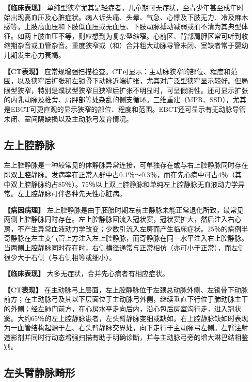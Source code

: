 \textbf{【临床表现】}
单纯型狭窄尤其是轻症者，儿童期可无症状，至青少年甚至成年时始出现高血压及心脏症状。病人诉头痛、头晕、气急、心悸及下肢无力、冷及麻木感等。上肢高血压和下肢低血压或无血压、下肢动脉搏动减弱或扪不清为其典型体征。如两上肢血压不等，则应想到为复杂型缩窄。心前区、背部肩胛区常可听到收缩期杂音或血管杂音。重度狭窄或（和）合并粗大动脉导管未闭、室缺者常于婴幼儿期发生心力衰竭。

\textbf{【CT表现】}
应常规增强扫描检查。CT可显示：主动脉狭窄的部位、程度和范围，以及狭窄后扩张和左锁骨下动脉近端扩张，尤其对广泛型狭窄显示较好。但局限型狭窄，特别是蹼状型狭窄且狭窄后扩张不明显时，可呈假阴性。还可显示扩张的内乳动脉及椎旁、肩胛部等处杂乱的侧支循环。三维重建（MPR、SSD），尤其是EBCT可更直观的显示狭窄的部位、程度和范围。EBCT还可显示有无动脉导管未闭、室间隔缺损以及主动脉弓发育情况。

\subsection{左上腔静脉}

左上腔静脉是一种较常见的体静脉异常连接，可单独存在或与右上腔静脉同时存在即双上腔静脉。发病率在正常人群中占0.1％～0.3％，而在先心病中可占4％（其中双上腔静脉约占85％）。75％以上双上腔静脉和单纯左上腔静脉无血液动力学异常。左上腔静脉可伴各种先天性心脏病。

\textbf{【病因病理】}
左上腔静脉是由于胚胎时期左前主静脉未能正常退化所致，最常见两侧上腔静脉同时存在。左上腔静脉回流入冠状窦，冠状窦扩大，然后注入右心房，不产生异常血液动力学改变；少数引流入左房而产生临床症状。25％的病例半奇静脉在左主支气管上方注入左上腔静脉，而奇静脉在同一水平注入右上腔静脉。当两侧上腔静脉同时存在时，右侧横径通常与正常相仿（亦可小于正常），而左侧很少大于右侧（与右侧相等或细小）。

\textbf{【临床表现】} 大多无症状，合并先心病者有相应症状。

\textbf{【CT表现】}
在主动脉弓上层面，左上腔静脉位于左颈总动脉外侧、左锁骨下动脉前方；在主动脉弓及其以下层面位于主动脉弓外侧，继续垂直下行位于肺动脉主干的外侧；经左肺门前方，在心房水平走向后内，沿心包后房室沟行走，进入冠状窦。大约65％的左上腔静脉患者，左头臂静脉变细或缺如。右上腔静脉缺如时表现为一血管结构起源于左、右头臂静脉交界处，向下走行于主动脉弓左侧。左臂注射造影剂并同时行动态增强扫描有助于明确诊断，并与主动脉弓旁的增大淋巴结相鉴别。

\subsection{左头臂静脉畸形}

